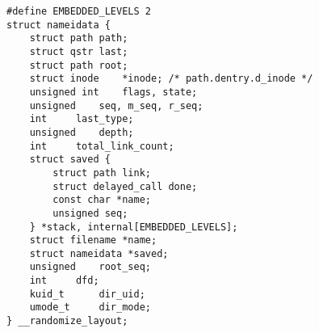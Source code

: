 
\begin{lstlisting}
#define EMBEDDED_LEVELS 2
struct nameidata {
	struct path	path;
	struct qstr	last;
	struct path	root;
	struct inode	*inode; /* path.dentry.d_inode */
	unsigned int	flags, state;
	unsigned	seq, m_seq, r_seq;
	int		last_type;
	unsigned	depth;
	int		total_link_count;
	struct saved {
		struct path link;
		struct delayed_call done;
		const char *name;
		unsigned seq;
	} *stack, internal[EMBEDDED_LEVELS];
	struct filename	*name;
	struct nameidata *saved;
	unsigned	root_seq;
	int		dfd;
	kuid_t		dir_uid;
	umode_t		dir_mode;
} __randomize_layout;
\end{lstlisting}
